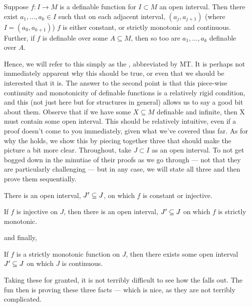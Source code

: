 \begin{theorem}[The \MT]
	\label{thm:monotonicity}
  Suppose $f \colon I \to M$ is a definable function for $I \subset M$ an open interval. Then there exist $a_1, \hdots, a_k \in I$ such that on each adjacent interval, $(a_j, a_{j+1})$ (where $I = (a_0, a_{k+1})$) $f$ is either constant, or strictly monotonic and continuous. Further, if $f$ is definable over some $A \subseteq M$, then so too are $a_1, \hdots, a_{k}$ definable over $A$.
\end{theorem}

Hence, we will refer to this simply as the \Mt, abbreviated by MT. It is perhaps not immediately apparent why this should be true, or even that we should be interested that it is. The answer to the second point is that this piece-wise continuity and monotonicity of definable functions is a relatively rigid condition, and this (not just here but for structures in general) allows us to say a good bit about them. Observe that if we have some $X \subseteq M$ definable and infinite, then X must contain some open interval. This should be relatively intuitive, even if a proof doesn't come to you immediately, given what we've covered thus far. As for why the \Mt holds, we show this by piecing together three \lemmas that should make the picture a bit more clear. Throughout, take $J \subset I$ as an open interval. To not get bogged down in the minutiae of their proofs as we go through — not that they are particularly challenging — but in any case, we will state all three and then prove them sequentially.

\begin{lemma}
\label{lemma:monotonic-1}
  There is an open interval, $J^{\prime} \subseteq J$, on which $f$ is constant or injective.
\end{lemma}

\begin{lemma}
\label{lemma:monotonic-2}
  If $f$ is injective on $J$, then there is an open interval, $J^{\prime} \subseteq J$ on which $f$ is strictly monotonic.
\end{lemma}

and finally,

\begin{lemma}
\label{lemma:monotonic-3}
  If $f$ is a strictly monotonic function on $J$, then there exists some open interval $ J^{\prime} \subseteq J$ on which $J$ is continuous.
\end{lemma}

Taking these \lemmas for granted, it is not terribly difficult to see how the \Mt falls out. The fun then is proving these three facts — which is nice, as they are not terribly complicated.

